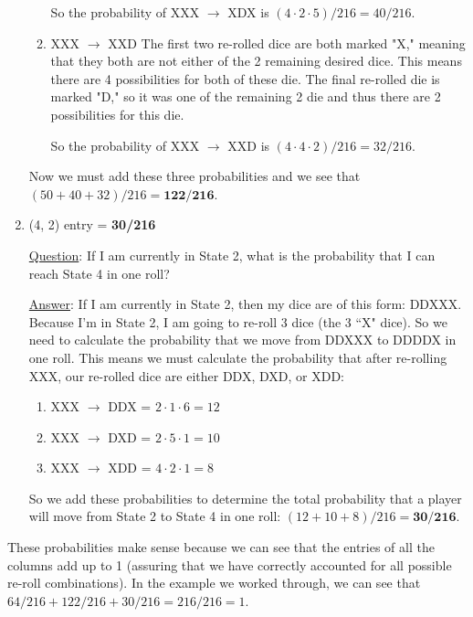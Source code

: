 \documentclass[12pt,a4paper]{article}
\begin{document}
\begin{enumerate}
\begin{enumerate}
            So the probability of XXX $\rightarrow$ XDX is $(4 \cdot 2 \cdot 5)/216 = 40/216$.
            \item XXX $\rightarrow$ XXD
            The first two re-rolled dice are both marked "X," meaning that they both are not either of the 2 remaining desired dice. This means there are 4 possibilities for both of these die. The final re-rolled die is marked "D," so it was one of the remaining 2 die and thus there are 2 possibilities for this die.

            So the probability of XXX $\rightarrow$ XXD is $(4 \cdot 4 \cdot 2)/216 = 32/216$.
        \end{enumerate}
        Now we must add these three probabilities and we see that $(50+40+32)/216 = \textbf{122/216}$.
        \item (4, 2) entry = \textbf{30/216}

        \underline{Question}: If I am currently in State 2, what is the probability that I can reach State 4 in one roll?

        \underline{Answer}: If I am currently in State 2, then my dice are of this form: DDXXX. Because I'm in State 2, I am going to re-roll 3 dice (the 3 ``X" dice). So we need to calculate the probability that we move from DDXXX to DDDDX in one roll. This means we must calculate the probability that after re-rolling XXX, our re-rolled dice are either DDX, DXD, or XDD:
        \begin{enumerate}
            \item XXX $\rightarrow$ DDX = $2 \cdot 1 \cdot 6 = 12$
            \item XXX $\rightarrow$ DXD = $2 \cdot 5 \cdot 1 = 10$
            \item XXX $\rightarrow$ XDD = $4 \cdot 2 \cdot 1 = 8$
        \end{enumerate}
        So we add these probabilities to determine the total probability that a player will move from State 2 to State 4 in one roll: $(12 + 10 + 8) / 216 = \textbf{30/216}$.
    \end{enumerate}

    \begin{flushleft}
    These probabilities make sense because we can see that the entries of all the columns add up to 1 (assuring that we have correctly accounted for all possible re-roll combinations). In the example we worked through, we can see that $64/216 + 122/216 + 30/216 = 216/216 = 1$.
    \end{flushleft}
\end{document}
